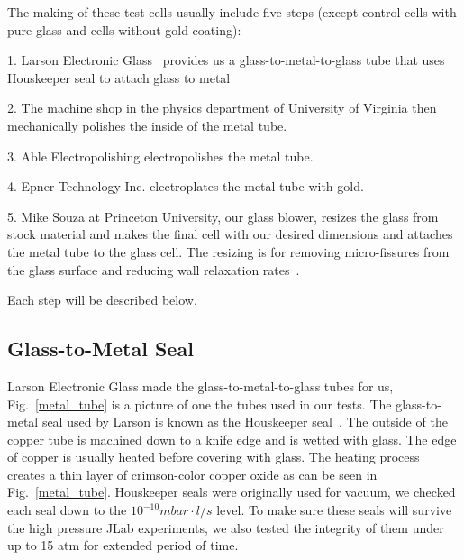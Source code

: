 The making of these test cells usually include five steps (except control cells with pure glass and cells without gold coating):

1. Larson Electronic Glass~\cite{Larson} provides us a glass-to-metal-to-glass tube that uses Houskeeper seal to attach glass to metal

2. The machine shop in the physics department of University of Virginia then mechanically polishes the inside of the metal tube.

3. Able Electropolishing electropolishes the metal tube.

4. Epner Technology Inc. electroplates the metal tube with gold.

5. Mike Souza at Princeton University, our glass blower, resizes the glass from stock material and makes the final cell with our desired dimensions and attaches the metal tube to the glass cell. The resizing is for removing micro-fissures from the glass surface and reducing wall relaxation rates~\cite{Cates1993}.

Each step will be described below.

\subsection{Glass-to-Metal Seal}

Larson Electronic Glass made the glass-to-metal-to-glass tubes for us, Fig.~\ref{metal_tube} is a picture of one the tubes used in our tests. The glass-to-metal seal used by Larson is known as the Houskeeper seal~\cite{Houskeeper}. The outside of the copper tube is machined down to a knife edge and is wetted with glass. The edge of copper is usually heated before covering with glass. The heating process creates a thin layer of crimson-color copper oxide as can be seen in Fig.~\ref{metal_tube}. Houskeeper seals were originally used for vacuum, we checked each seal down to the $10^{-10}mbar\cdot l/s$ level. To make sure these seals will survive the high pressure JLab experiments, we also tested the integrity of them under up to 15 atm for extended period of time.

